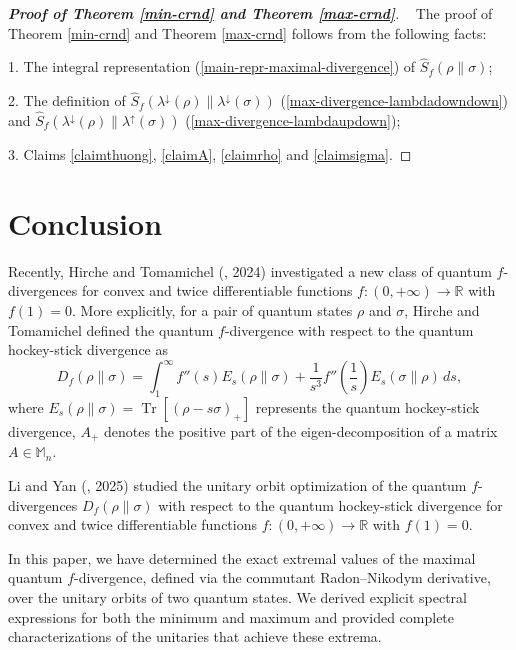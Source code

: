 \documentclass[10pt,reqno]{amsart}
\theoremstyle{break-italic}
\theoremstyle{break-italic}
\theoremstyle{break-italic}
\theoremstyle{break-italic}
\theoremstyle{break-italic}
\theoremstyle{break-italic}
\theoremstyle{break-italic}
\theoremstyle{break-italic}
\theoremstyle{break-roman}
\theoremstyle{standard}
\theoremstyle{varthm-roman}
\theoremstyle{varthm-italic}
\theoremstyle{varthm-roman-break}
\theoremstyle{varthm-italic-break}
\theoremstyle{varthm-roman-no-punctuation}
\theoremstyle{varthm-italic-no-punctuation}
\numberwithin{equation}{section}
\begin{document}
\begin{proof}[\textbf{Proof of Theorem \ref{min-crnd} and Theorem \ref{max-crnd}}]~ 
The proof of Theorem \ref{min-crnd} and Theorem \ref{max-crnd} follows from the following facts:

1. The integral representation (\ref{main-repr-maximal-divergence}) of $\widehat{S}_f(\rho\|\sigma)$;

2. The definition of $\widehat{S}_f(\lambda^\downarrow(\rho)\|\lambda^\downarrow(\sigma))$ (\ref{max-divergence-lambdadowndown}) and $\widehat{S}_f(\lambda^\downarrow(\rho)\|\lambda^\uparrow(\sigma))$ (\ref{max-divergence-lambdaupdown});

3. Claims  \ref{claimthuong},   \ref{claimA},   \ref{claimrho} and  \ref{claimsigma}.
\end{proof}

 



\section{Conclusion}\label{sec:conclusion}
Recently, Hirche and  Tomamichel (\cite{HirTo}, 2024) investigated  a new class of quantum $f$-divergences for convex and twice differentiable functions $f : (0, +\infty) \rightarrow \mathbb R$ with $f (1) = 0$. More explicitly, for a pair of quantum states $\rho$ and $\sigma$, Hirche and  Tomamichel defined the quantum $f$-divergence with respect to the quantum hockey-stick divergence as
\begin{equation}
D_f(\rho\|\sigma) = \int_1^{\infty} f''(s)E_s(\rho\|\sigma) + \frac{1}{s^3} f''\!\left(\frac{1}{s}\right)E_s(\sigma\|\rho)\,ds,
\end{equation}
where $E_s(\rho\|\sigma)=\operatorname{Tr}[(\rho-s\sigma)_+]$ represents the quantum hockey-stick divergence, $A_+$  denotes the positive   part of the eigen-decomposition of a matrix $A\in \mathbb M_n$.  

Li and Yan (\cite{LiYan}, 2025) studied the unitary orbit optimization of the quantum $f$-divergences $D_f(\rho\|\sigma)$ with respect to the quantum hockey-stick divergence for convex and twice differentiable functions $f : (0, +\infty) \rightarrow \mathbb R$ with $f (1) = 0$.

In this paper, we have determined the exact extremal values of the maximal quantum $f$-divergence, defined via the commutant Radon--Nikodym derivative, over the unitary orbits of two quantum states. We derived explicit spectral expressions for both the minimum and maximum and provided complete characterizations of the unitaries that achieve these extrema.
\end{document}
